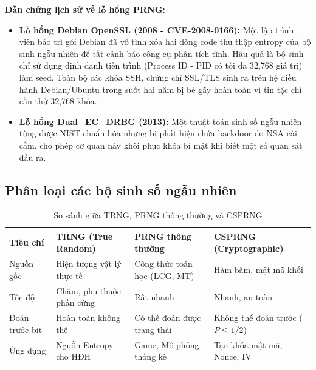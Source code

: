 \documentclass[12pt,a4paper]{article}
\theoremstyle{plain}
\begin{document}
\textbf{Dẫn chứng lịch sử về lỗ hổng PRNG:}
\begin{itemize}
    \item \textbf{Lỗ hổng Debian OpenSSL (2008 - CVE-2008-0166):} Một lập trình viên bảo trì gói Debian đã vô tình xóa hai dòng code thu thập entropy của bộ sinh ngẫu nhiên để tắt cảnh báo công cụ phân tích tĩnh. Hậu quả là bộ sinh chỉ sử dụng định danh tiến trình (Process ID - PID có tối đa 32,768 giá trị) làm seed. Toàn bộ các khóa SSH, chứng chỉ SSL/TLS sinh ra trên hệ điều hành Debian/Ubuntu trong suốt hai năm bị bẻ gãy hoàn toàn vì tin tặc chỉ cần thử 32,768 khóa.
    \item \textbf{Lỗ hổng Dual\_EC\_DRBG (2013):} Một thuật toán sinh số ngẫu nhiên từng được NIST chuẩn hóa nhưng bị phát hiện chứa backdoor do NSA cài cắm, cho phép cơ quan này khôi phục khóa bí mật khi biết một số quan sát đầu ra.
\end{itemize}

\subsection{Phân loại các bộ sinh số ngẫu nhiên}

\begin{table}[h!]
\centering
\small
\begin{tabular}{@{}llll@{}}
\toprule
\textbf{Tiêu chí} & \textbf{TRNG (True Random)} & \textbf{PRNG thông thường} & \textbf{CSPRNG (Cryptographic)} \\ \midrule
Nguồn gốc & Hiện tượng vật lý thực tế & Công thức toán học (LCG, MT) & Hàm băm, mật mã khối \\
Tốc độ & Chậm, phụ thuộc phần cứng & Rất nhanh & Nhanh, an toàn \\
Đoán trước bit & Hoàn toàn không thể & Có thể đoán được trạng thái & Không thể đoán trước ($P \le 1/2$) \\
Ứng dụng & Nguồn Entropy cho HĐH & Game, Mô phỏng thống kê & Tạo khóa mật mã, Nonce, IV \\ \bottomrule
\end{tabular}
\caption{So sánh giữa TRNG, PRNG thông thường và CSPRNG}
\end{table}
\end{document}
